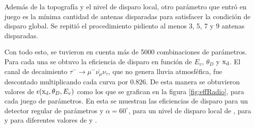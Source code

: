 	Adem\'as de la topograf\'ia y el nivel de disparo local, otro par\'ametro que entr\'o en juego es la m\'inima cantidad de antenas disparadas para satisfacer la condici\'on de disparo global.
	Se repiti\'o el procedimiento pidiento al menos 3, 5, 7 y 9 antenas disparadas.
	
	Con todo esto, se tuvieron en cuenta m\'as de 5000 combinaciones de par\'ametros.
	Para cada una se obtuvo la eficiencia de disparo en funci\'on de $E_v$, $\theta_D$ y ${\rm x_d}$.
	El canal de decaimiento $\tau^{-}\rightarrow \mu^{-}\bar{\nu_{\mu}}\nu_{\tau}$, que no genera lluvia atmosf\'efica, fue descontado multiplicando cada curva por $0.826$.
	De esta manera se obtuvieron valores de $\epsilon ({\rm x_d},\theta_D,E_v)$ como los que se grafican en la figura \ref{fig:effRadio}, para cada juego de par\'ametros. 
	En esta se muestran las eficiencias de disparo para un detector regular de par\'ametros  y $\alpha=60^\circ$, para un nivel de disparo local de , para  y para diferentes valores de \xd{} y \td{}.
